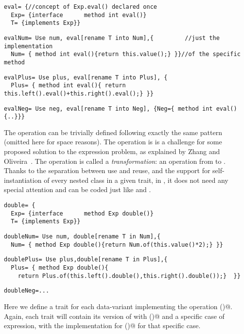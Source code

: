 \begin{lstlisting}
eval= {//concept of Exp.eval() declared once
  Exp= {interface      method int eval()}
  T= {implements Exp}}
\end{lstlisting}
\multiCode
\begin{lstlisting}
evalNum= Use num, eval[rename T into Num],{         //just the implementation
  Num= { method int eval(){return this.value();} }}//of the specific method
\end{lstlisting}
\multiCode
\begin{lstlisting}
evalPlus= Use plus, eval[rename T into Plus], {
  Plus= { method int eval(){ return this.left().eval()+this.right().eval();} }}
\end{lstlisting}
\multiCode
\begin{lstlisting}
evalNeg= Use neg, eval[rename T into Neg], {Neg={ method int eval(){..}}}
\end{lstlisting}

The \Q@show@ operation can be trivially defined
following exactly the same pattern (omitted here for space reasons).
The operation \Q@double@ is is a challenge for some proposed solution
to the expression problem, as explained by Zhang and Oliveira~\cite{zhang2017evf}.
The \Q@double@ operation is called a \emph{transformation}: an operation from \Q@Exp@ to \Q@Exp@.
Thanks to the separation between use and reuse, and the support
for self-instantiation of every nested class in a given trait,
in \name, it does not need any special attention
and can be coded just like \Q@eval@ and \Q@show@.
\begin{lstlisting}
double= {
  Exp= {interface      method Exp double()}
  T= {implements Exp}}
\end{lstlisting}
\multiCode
\begin{lstlisting}
doubleNum= Use num, double[rename T in Num],{
  Num= { method Exp double(){return Num.of(this.value()*2);} }}
\end{lstlisting}
\multiCode
\begin{lstlisting}
doublePlus= Use plus,double[rename T in Plus],{
  Plus= { method Exp double(){
    return Plus.of(this.left().double(),this.right().double());}  }}
\end{lstlisting}
\multiCode
\begin{lstlisting}
doubleNeg=...
\end{lstlisting}
Here we define a trait for each data-variant implementing the operation \Q@double()@.
Again, each trait will contain its version of \Q@Exp@ with \Q@double()@
and a specific case of expression, with the implementation for \Q@double()@
for that specific case.

